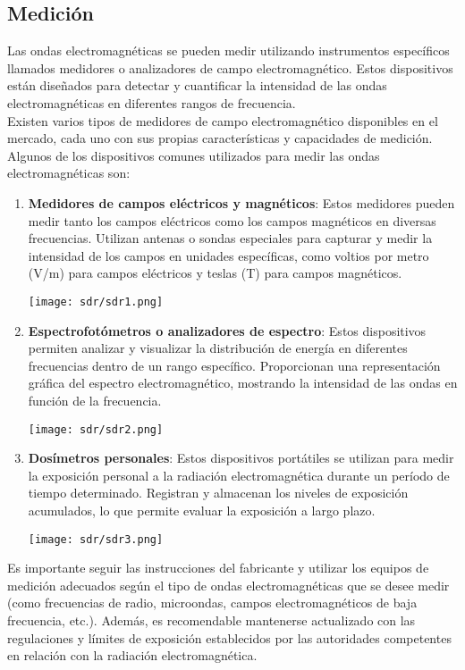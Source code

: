 \documentclass[
	12pt, %
	fleqn, %
	a4paper, %
	oneside, %
]{LegrandOrangeBook}
\begin{document}
\subsection{Medición}
Las ondas electromagnéticas se pueden medir utilizando instrumentos específicos llamados medidores o analizadores de campo electromagnético. Estos dispositivos están diseñados para detectar y cuantificar la intensidad de las ondas electromagnéticas en diferentes rangos de frecuencia.\\
Existen varios tipos de medidores de campo electromagnético disponibles en el mercado, cada uno con sus propias características y capacidades de medición. Algunos de los dispositivos comunes utilizados para medir las ondas electromagnéticas son:
\begin{enumerate}
\item \textbf{Medidores de campos eléctricos y magnéticos}: Estos medidores pueden medir tanto los campos eléctricos como los campos magnéticos en diversas frecuencias. Utilizan antenas o sondas especiales para capturar y medir la intensidad de los campos en unidades específicas, como voltios por metro (V/m) para campos eléctricos y teslas (T) para campos magnéticos.
\begin{center}
\texttt{[image: sdr/sdr1.png]}
\end{center}
\item \textbf{Espectrofotómetros o analizadores de espectro}: Estos dispositivos permiten analizar y visualizar la distribución de energía en diferentes frecuencias dentro de un rango específico. Proporcionan una representación gráfica del espectro electromagnético, mostrando la intensidad de las ondas en función de la frecuencia.
\begin{center}
\texttt{[image: sdr/sdr2.png]}
\end{center}
\item \textbf{Dosímetros personales}: Estos dispositivos portátiles se utilizan para medir la exposición personal a la radiación electromagnética durante un período de tiempo determinado. Registran y almacenan los niveles de exposición acumulados, lo que permite evaluar la exposición a largo plazo.
\begin{center}
\texttt{[image: sdr/sdr3.png]}
\end{center}
\end{enumerate}
Es importante seguir las instrucciones del fabricante y utilizar los equipos de medición adecuados según el tipo de ondas electromagnéticas que se desee medir (como frecuencias de radio, microondas, campos electromagnéticos de baja frecuencia, etc.). Además, es recomendable mantenerse actualizado con las regulaciones y límites de exposición establecidos por las autoridades competentes en relación con la radiación electromagnética.
\end{document}
